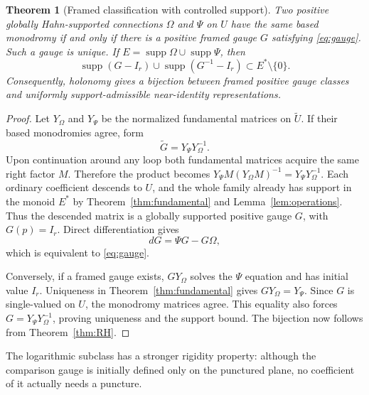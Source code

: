 \documentclass[11pt,letterpaper]{article}
\numberwithin{equation}{section}
\newtheorem{theorem}{Theorem}[section]
\theoremstyle{definition}
\theoremstyle{remark}
\newcommand{\supp}{\operatorname{supp}}
\begin{document}
\begin{theorem}[Framed classification with controlled support]
\label{thm:gauge}
Two positive globally Hahn-supported connections $\Omega$ and $\Psi$ on $U$
have the same based monodromy if and only if there is a positive framed
gauge $G$ satisfying \eqref{eq:gauge}. Such a gauge is unique. If
$E=\supp\Omega\cup\supp\Psi$, then
\begin{equation}\label{eq:gauge-support}
 \supp(G-I_r)\cup\supp(G^{-1}-I_r)\subset E^*\setminus\{0\}.
\end{equation}
Consequently, holonomy gives a bijection between framed positive gauge
classes and uniformly support-admissible near-identity representations.
\end{theorem}
\begin{proof}
Let $Y_\Omega$ and $Y_\Psi$ be the normalized fundamental matrices on
$\widetilde U$. If their based monodromies agree, form
\[
 \widetilde G=Y_\Psi Y_\Omega^{-1}.
\]
Upon continuation around any loop both fundamental matrices acquire the
same right factor $M$. Therefore the product becomes
$Y_\Psi M(Y_\Omega M)^{-1}=Y_\Psi Y_\Omega^{-1}$.
Each ordinary coefficient descends to $U$, and the whole family already
has support in the monoid $E^*$ by Theorem~\ref{thm:fundamental} and
Lemma~\ref{lem:operations}. Thus the descended matrix is a globally
supported positive gauge $G$, with $G(p)=I_r$. Direct differentiation gives
\[
 dG=\Psi G-G\Omega,
\]
which is equivalent to \eqref{eq:gauge}.

Conversely, if a framed gauge exists, $GY_\Omega$ solves the $\Psi$ equation
and has initial value $I_r$. Uniqueness in
Theorem~\ref{thm:fundamental} gives $GY_\Omega=Y_\Psi$. Since $G$ is
single-valued on $U$, the monodromy matrices agree. This equality also
forces $G=Y_\Psi Y_\Omega^{-1}$, proving uniqueness and the support bound.
The bijection now follows from Theorem~\ref{thm:RH}.
\end{proof}

The logarithmic subclass has a stronger rigidity property: although the
comparison gauge is initially defined only on the punctured plane, no
coefficient of it actually needs a puncture.
\end{document}
